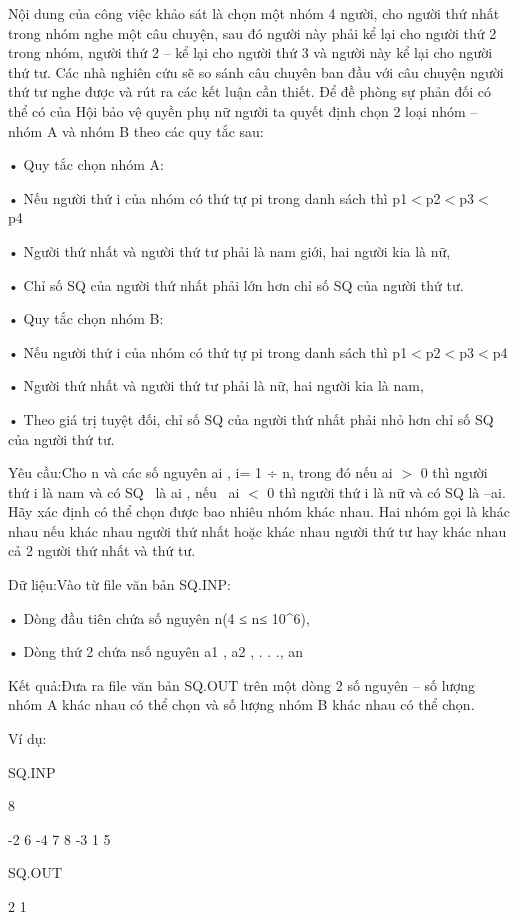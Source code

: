 Nội dung của công việc khảo sát là chọn một nhóm 4 người, cho người thứ nhất trong nhóm nghe một câu chuyện, sau đó người này phải kể lại cho người thứ 2 trong nhóm, người thứ 2 – kể lại cho người thứ 3 và người này kể lại cho người thứ tư. Các nhà nghiên cứu sẽ so sánh câu chuyên ban đầu với câu chuyện người thứ tư nghe được và rút ra các kết luận cần thiết. Để đề phòng sự phản đối có thể có của Hội bảo vệ quyền phụ nữ người ta quyết định chọn 2 loại nhóm – nhóm A và nhóm B theo các quy tắc sau:

• Quy tắc chọn nhóm A:

• Nếu người thứ i của nhóm có thứ tự pi trong danh sách thì p1$<$p2$<$p3$<$p4 

• Người thứ nhất và người thứ tư phải là nam giới, hai người kia là nữ, 

• Chỉ số SQ của người thứ nhất phải lớn hơn chỉ số SQ của người thứ tư.

• Quy tắc chọn nhóm B:

• Nếu người thứ i của nhóm có thứ tự pi trong danh sách thì p1$<$p2$<$p3$<$p4

• Người thứ nhất và người thứ tư phải là nữ, hai người kia là nam, 

• Theo giá trị tuyệt đối, chỉ số SQ của người thứ nhất phải nhỏ hơn chỉ số SQ của người thứ tư.

Yêu cầu:Cho n và các số nguyên ai , i= 1 ÷ n, trong đó nếu ai $>$ 0 thì người thứ i là nam và có SQ  là ai , nếu  ai $<$ 0 thì người thứ i là nữ và có SQ là –ai. Hãy xác định có thể chọn được bao nhiêu nhóm khác nhau. Hai nhóm gọi là khác nhau nếu khác nhau người thứ nhất hoặc khác nhau người thứ tư hay khác nhau cả 2 người thứ nhất và thứ tư. 

Dữ liệu:Vào từ file văn bản SQ.INP:

• Dòng đầu tiên chứa số nguyên n(4 ≤ n≤ 10\textasciicircum6),

• Dòng thứ 2 chứa nsố nguyên a1 , a2 , . . ., an

Kết quả:Đưa ra file văn bản SQ.OUT trên một dòng 2 số nguyên – số lượng nhóm A khác nhau có thể chọn và số lượng nhóm B khác nhau có thể chọn.

Ví dụ:

SQ.INP 

8

-2 6 -4 7 8 -3 1 5

SQ.OUT

2 1